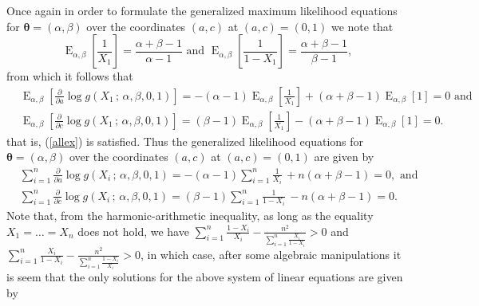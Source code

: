 \documentclass[lineno]{biometrika}
\newcommand{\bs}{\boldsymbol}
\newcommand{\on}{\operatorname}
\begin{document}
Once again in order to formulate the generalized maximum likelihood equations for $\bs{\theta}=(\alpha,\beta)$ over the coordinates $(a,c)$ at $(a,c)=(0,1)$ we note that
\begin{equation}\label{relations2}\on{E}_{\alpha,\beta}\left[\frac{1}{X_1}\right]=\frac{\alpha+\beta-1}{\alpha-1}\mbox{ and }\on{E}_{\alpha,\beta}\left[\frac{1}{1-X_1}\right]=\frac{\alpha+\beta-1}{\beta-1},
\end{equation}
from which it follows that
\begin{equation*}
\begin{aligned}
&\on{E}_{\alpha,\beta} \left[\frac{\partial}{\partial a}  \log g(X_1\,;\,\alpha,\beta,0,1)\right] = -(\alpha-1) \on{E}_{\alpha,\beta}\left[\frac{1}{X_1}\right] + (\alpha+\beta-1) \on{E}_{\alpha,\beta}\left[1\right]=0\mbox{ and}\\
&\on{E}_{\alpha,\beta} \left[\frac{\partial}{\partial c}  \log g(X_1\,;\,\alpha,\beta,0,1)\right] =(\beta-1) \on{E}_{\alpha,\beta}\left[\frac{1}{X_1}\right] - (\alpha+\beta-1) \on{E}_{\alpha,\beta}\left[1\right]=0.
\end{aligned}
\end{equation*}
that is, (\ref{allex}) is satisfied. Thus  the generalized likelihood equations for $\bs{\theta}=(\alpha,\beta)$ over the coordinates $(a,c)$ at $(a,c)=(0,1)$ are given by
\begin{equation*}
\begin{aligned}
&\sum_{i=1}^n \frac{\partial}{\partial a}  \log g(X_i\,;\,\alpha,\beta,0,1)=-(\alpha -1)\sum _{i=1}^{n}{\frac {1}{X_{i}}}\,+n(\alpha +\beta -1)=0,\mbox{ and }\\
&\sum_{i=1}^n \frac{\partial}{\partial c}  \log g(X_i\,;\,\alpha,\beta,0,1)=(\beta-1)\sum _{i=1}^{n}{\frac {1}{1-X_{i}}}\,-n(\alpha +\beta -1)=0.
\end{aligned}
\end{equation*}
Note that, from the harmonic-arithmetic inequality, as long as the equality $X_1=\ldots=X_n$ does not hold, we have $\sum_{i=1}^{n}\frac{1-X_i}{X_i}-\frac{n^2}{\sum_{i=1}^{n}\frac{X_i}{1-X_i}}>0$ and $\sum_{i=1}^{n}\frac{X_i}{1-X_i}-\frac{n^2}{\sum_{i=1}^{n}\frac{1-X_i}{X_i}}>0$, in which case, after some algebraic manipulations it is seem that the only solutions for the above system of linear equations are given by
\end{document}

